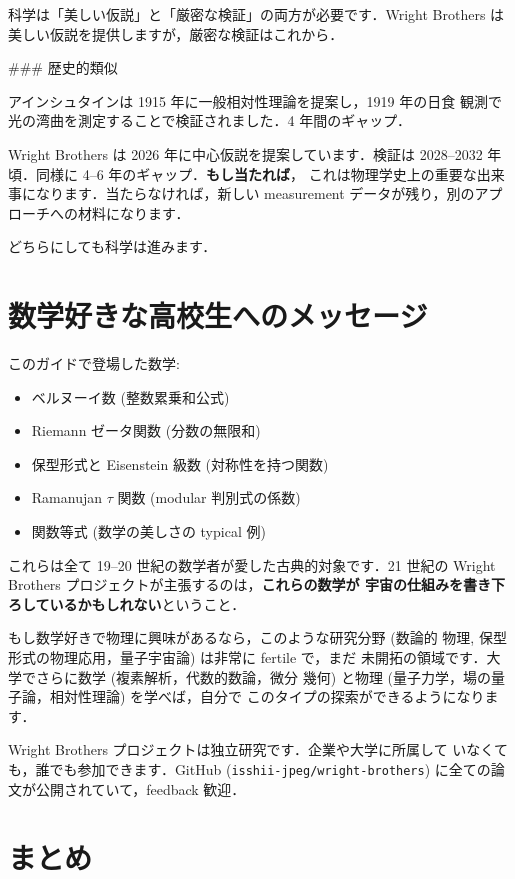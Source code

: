 \documentclass[11pt,a4paper]{article}
\begin{document}
科学は「美しい仮説」と「厳密な検証」の両方が必要です．Wright Brothers は
美しい仮説を提供しますが，厳密な検証はこれから．

### 歴史的類似

アインシュタインは 1915 年に一般相対性理論を提案し，1919 年の日食
観測で光の湾曲を測定することで検証されました．4 年間のギャップ．

Wright Brothers は 2026 年に中心仮説を提案しています．検証は
2028--2032 年頃．同様に 4--6 年のギャップ．\textbf{もし当たれば}，
これは物理学史上の重要な出来事になります．当たらなければ，新しい
measurement データが残り，別のアプローチへの材料になります．

どちらにしても科学は進みます．

\section{数学好きな高校生へのメッセージ}

このガイドで登場した数学:
\begin{itemize}
\item ベルヌーイ数 (整数累乗和公式)
\item Riemann ゼータ関数 (分数の無限和)
\item 保型形式と Eisenstein 級数 (対称性を持つ関数)
\item Ramanujan $\tau$ 関数 (modular 判別式の係数)
\item 関数等式 (数学の美しさの typical 例)
\end{itemize}

これらは全て 19--20 世紀の数学者が愛した古典的対象です．21 世紀の
Wright Brothers プロジェクトが主張するのは，\textbf{これらの数学が
宇宙の仕組みを書き下ろしているかもしれない}ということ．

もし数学好きで物理に興味があるなら，このような研究分野 (数論的
物理, 保型形式の物理応用，量子宇宙論) は非常に fertile で，まだ
未開拓の領域です．大学でさらに数学 (複素解析，代数的数論，微分
幾何) と物理 (量子力学，場の量子論，相対性理論) を学べば，自分で
このタイプの探索ができるようになります．

Wright Brothers プロジェクトは独立研究です．企業や大学に所属して
いなくても，誰でも参加できます．GitHub (\texttt{isshii-jpeg/wright-brothers})
に全ての論文が公開されていて，feedback 歓迎．

\section{まとめ}
\end{document}
